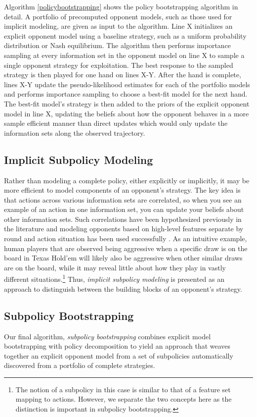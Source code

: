 \documentclass{aamas2013}
\begin{document}
    Algorithm \ref{policybootstrapping} shows the policy bootstrapping algorithm in detail. A portfolio of precomputed opponent models, such as those used for implicit modeling, are given as input to the algorithm. Line X initializes an explicit opponent model using a baseline strategy, such as a uniform probability distribution or Nash equilibrium. The algorithm then performs importance sampling at every information set in the opponent model on line X to sample a single opponent strategy for exploitation. The best response to the sampled strategy is then played for one hand on lines X-Y. After the hand is complete, lines X-Y update the pseudo-likelihood estimates for each of the portfolio models and performs importance sampling to choose a best-fit model for the next hand. The best-fit model's strategy is then added to the priors of the explicit opponent model in line X, updating the beliefs about how the opponent behaves in a more sample efficient manner than direct updates which would only update the information sets along the observed trajectory.

    \subsection{Implicit Subpolicy Modeling}
    Rather than modeling a complete policy, either explicitly or implicitly, it may be more efficient to model components of an opponent's strategy. The key idea is that actions across various information sets are correlated, so when you see an example of an action in one information set, you can update your beliefs about other information sets. Such correlations have been hypothesized previously in the literature \cite{bayesbluff,shortterm} and modeling opponents based on high-level features separate by round and action situation has been used successfully \cite{ponsen2009evolutionary}. As an intuitive example, human players that are observed being aggressive when a specific draw is on the board in Texas Hold'em will likely also be aggressive when other similar draws are on the board, while it may reveal little about how they play in vastly different situations.\footnote{The notion of a subpolicy in this case is similar to that of a feature set mapping to actions. However, we separate the two concepts here as the distinction is important in subpolicy bootstrapping.} Thus, \textit{implicit subpolicy modeling} is presented as an approach to distinguish between the building blocks of an opponent's strategy.

    \subsection{Subpolicy Bootstrapping}
    Our final algorithm, \textit{subpolicy bootstrapping} combines explicit model bootstrapping with policy decomposition to yield an approach that weaves together an explicit opponent model from a set of subpolicies automatically discovered from a portfolio of complete strategies.
\end{document}
